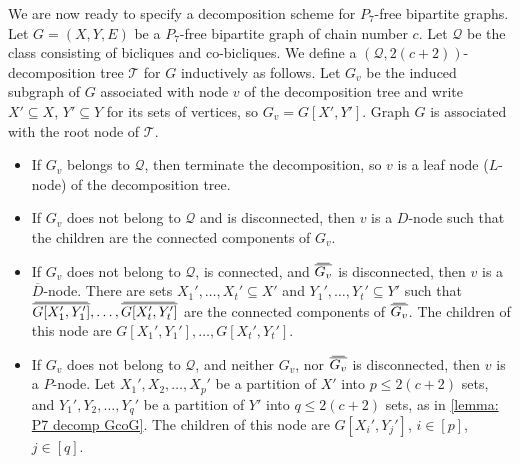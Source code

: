 \documentclass{theoretics}
\newcommand{\cQ}{\ensuremath{\mathcal{Q}}}
\newcommand{\cT}{\ensuremath{\mathcal{T}}}
\newcommand\doverline[1]{%
  \setbox0=\hbox{$\!\overline{#1}\!$}%
  \ht0=\dimexpr\ht0-.2ex\relax%
  \,\overline{\copy0}\,%
}
\newcommand{\bc}[1]{\doverline{#1}} %
\begin{document}
We are now ready to specify a decomposition scheme for $P_7$-free bipartite graphs.
Let $G=(X,Y,E)$ be a $P_7$-free bipartite graph of chain number $c$.
Let $\cQ$ be the class consisting of bicliques and co-bicliques.
We define a $(\cQ,2(c+2))$-decomposition tree $\cT$ for $G$ inductively as follows. 
Let $G_v$ be the induced subgraph of $G$ associated with node $v$ of the decomposition tree and write $X' \subseteq X$, $Y' \subseteq Y$ for its sets of vertices, so $G_v = G[X',Y']$.
Graph $G$ is associated with the root node of $\cT$.
\begin{itemize}
	\item If $G_v$ belongs to $\cQ$, then terminate the decomposition, so $v$ is a leaf node ($L$-node) of the decomposition tree.
	
	\item If $G_v$ does not belong to $\cQ$ and is disconnected, then $v$ is a $D$-node such
	that the children are the connected components of $G_v$.
	
	\item If $G_v$ does not belong to $\cQ$, is connected, and $\bc{G_v}$ is disconnected,
	then $v$ is a $\overline D$-node.
	There are sets $X_1', \dotsc, X_t' \subseteq X'$ and $Y_1', \dotsc, Y_t' \subseteq Y'$ 
	such that $\bc{G[X_1',Y_1']}, \dotsc,  \bc{G[X_t',Y_t']}$ 
	are the connected components of $\bc{G_v}$. 
	The children of this node are $G[X_1',Y_1'], \dotsc, G[X_t',Y_t']$.
	
	\item If $G_v$ does not belong to $\cQ$, and neither $G_v$, nor $\bc{G_v}$ is disconnected,
	then $v$ is a $P$-node.
	Let $X_1', X_2, \ldots, X_p'$ be a partition of $X'$ into $p \leq 2(c+2)$ sets,
	and $Y_1', Y_2, \ldots, Y_q'$ be a partition of $Y'$ into $q \leq 2(c+2)$ sets,
	as in \cref{lemma: P7 decomp GcoG}.
	The children of this node are $G[X_i',Y_j']$, $i \in[p]$, $j \in [q]$.
\end{itemize}
\end{document}
